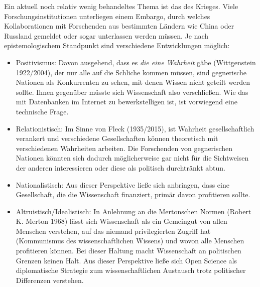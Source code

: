 \documentclass[
  letterpaper,
  DIV=11,
  numbers=noendperiod]{scrreprt}
\begin{document}
\begin{tcolorbox}[enhanced jigsaw, left=2mm, colback=white, colframe=quarto-callout-tip-color-frame, opacitybacktitle=0.6, opacityback=0, title=\textcolor{quarto-callout-tip-color}{\faLightbulb}\hspace{0.5em}{Krieg und Open Science}, toptitle=1mm, coltitle=black, colbacktitle=quarto-callout-tip-color!10!white, titlerule=0mm, bottomtitle=1mm, leftrule=.75mm, breakable, rightrule=.15mm, bottomrule=.15mm, toprule=.15mm, arc=.35mm]

Ein aktuell noch relativ wenig behandeltes Thema ist das des Krieges.
Viele Forschungsinstitutionen unterliegen einem Embargo, durch welches
Kollaborationen mit Forschenden aus bestimmten Ländern wie China oder
Russland gemeldet oder sogar unterlassen werden müssen. Je nach
epistemologischem Standpunkt sind verschiedene Entwicklungen möglich:

\begin{itemize}
\item
  Positivismus: Davon ausgehend, dass es \emph{die eine Wahrheit} gäbe
  (Wittgenstein 1922/2004), der nur alle auf die Schliche kommen müssen,
  sind gegnerische Nationen als Konkurrenten zu sehen, mit denen Wissen
  nicht geteilt werden sollte. Ihnen gegenüber müsste sich Wissenschaft
  also verschließen. Wie das mit Datenbanken im Internet zu
  bewerkstelligen ist, ist vorwiegend eine technische Frage.
\item
  Relationistisch: Im Sinne von Fleck (1935/2015), ist Wahrheit
  gesellschaftlich verankert und verschiedene Gesellschaften können
  theoretisch mit verschiedenen Wahrheiten arbeiten. Die Forschenden von
  gegnerischen Nationen könnten sich dadurch möglicherweise gar nicht
  für die Sichtweisen der anderen interessieren oder diese als politisch
  durchtränkt abtun.
\item
  Nationalistisch: Aus dieser Perspektive ließe sich anbringen, dass
  eine Gesellschaft, die die Wissenschaft finanziert, primär davon
  profitieren sollte.
\item
  Altruistisch/Idealistisch: In Anlehnung an die Mertonschen Normen
  (Robert K. Merton 1968) lässt sich Wissenschaft als ein Gemeingut von
  allen Menschen verstehen, auf das niemand privilegierten Zugriff hat
  (Kommunismus des wissenschaftlichen Wissens) und wovon alle Menschen
  profitieren können. Bei dieser Haltung macht Wissenschaft an
  politischen Grenzen keinen Halt. Aus dieser Perspektive ließe sich
  Open Science als diplomatische Strategie zum wissenschaftlichen
  Austausch trotz politischer Differenzen verstehen.
\end{itemize}


\end{tcolorbox}
\end{document}
